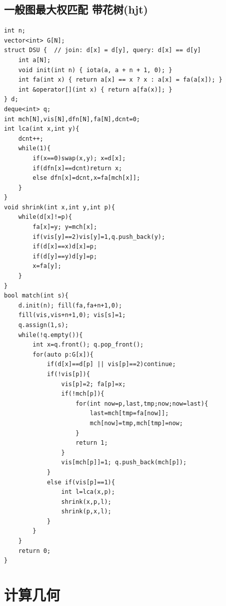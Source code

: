 \documentclass[a4]{ctexart}
\begin{document}
\subsection{一般图最大权匹配 带花树(hjt)}
\begin{lstlisting}
int n;
vector<int> G[N];
struct DSU {  // join: d[x] = d[y], query: d[x] == d[y]
    int a[N];
    void init(int n) { iota(a, a + n + 1, 0); }
    int fa(int x) { return a[x] == x ? x : a[x] = fa(a[x]); }
    int &operator[](int x) { return a[fa(x)]; }
} d;
deque<int> q;
int mch[N],vis[N],dfn[N],fa[N],dcnt=0;
int lca(int x,int y){
    dcnt++;
    while(1){
        if(x==0)swap(x,y); x=d[x];
        if(dfn[x]==dcnt)return x;
        else dfn[x]=dcnt,x=fa[mch[x]];
    }
}
void shrink(int x,int y,int p){
    while(d[x]!=p){
        fa[x]=y; y=mch[x];
        if(vis[y]==2)vis[y]=1,q.push_back(y);
        if(d[x]==x)d[x]=p;
        if(d[y]==y)d[y]=p;
        x=fa[y];
    }
}
bool match(int s){
    d.init(n); fill(fa,fa+n+1,0);
    fill(vis,vis+n+1,0); vis[s]=1;
    q.assign(1,s);
    while(!q.empty()){
        int x=q.front(); q.pop_front();
        for(auto p:G[x]){
            if(d[x]==d[p] || vis[p]==2)continue;
            if(!vis[p]){
                vis[p]=2; fa[p]=x;
                if(!mch[p]){
                    for(int now=p,last,tmp;now;now=last){
                        last=mch[tmp=fa[now]];
                        mch[now]=tmp,mch[tmp]=now;
                    }
                    return 1;
                }
                vis[mch[p]]=1; q.push_back(mch[p]);
            }
            else if(vis[p]==1){
                int l=lca(x,p);
                shrink(x,p,l);
                shrink(p,x,l);
            }
        }
    }
    return 0;
}
\end{lstlisting}

\section{计算几何}
\end{document}

